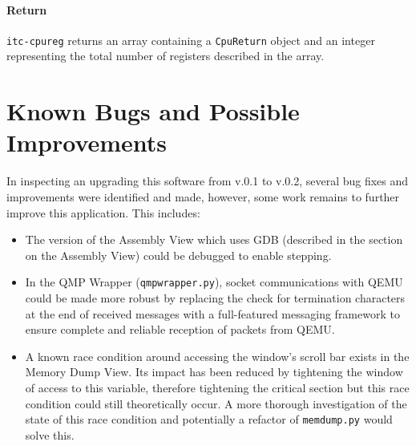 \documentclass{article}
\newcommand{\code}[1]{\texttt{#1}}
\begin{document}
\paragraph{Return} \code{itc-cpureg} returns an array containing a \code{CpuReturn} object and an integer representing the total number of registers described in the array.
 
 
\section{Known Bugs and Possible Improvements}

In inspecting an upgrading this software from v.0.1 to v.0.2, several bug fixes and improvements were identified and made, however, some work remains to further improve this application. This includes:

\begin{itemize}
    \item The version of the Assembly View which uses GDB (described in the section on the Assembly View) could be debugged to enable stepping.
    \item In the QMP Wrapper (\code{qmpwrapper.py}), socket communications with QEMU could be made more robust by replacing the check for termination characters at the end of received messages with a full-featured messaging framework to ensure complete and reliable reception of packets from QEMU.
    \item A known race condition around accessing the window's scroll bar exists in the Memory Dump View. Its impact has been reduced by tightening the window of access to this variable, therefore tightening the critical section but this race condition could still theoretically occur. A more thorough investigation of the state of this race condition and potentially a refactor of \code{memdump.py} would solve this.
\end{itemize} 
\end{document}
